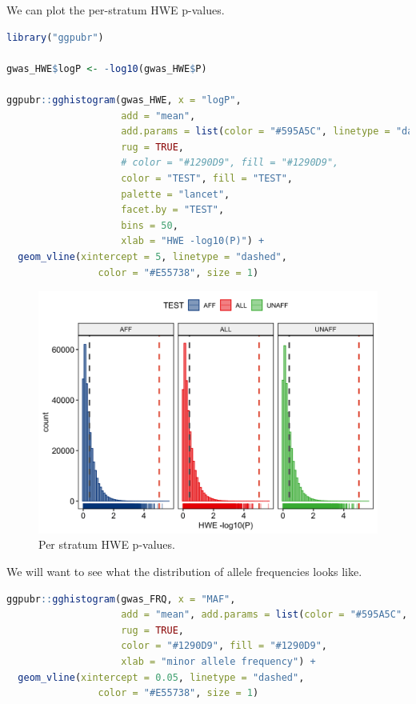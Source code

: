 \documentclass[
]{book}
\begin{document}
We can plot the per-stratum HWE p-values.

\begin{lstlisting}[language=R]
library("ggpubr")

gwas_HWE$logP <- -log10(gwas_HWE$P)

ggpubr::gghistogram(gwas_HWE, x = "logP",
                    add = "mean",
                    add.params = list(color = "#595A5C", linetype = "dashed", size = 1),
                    rug = TRUE,
                    # color = "#1290D9", fill = "#1290D9",
                    color = "TEST", fill = "TEST",
                    palette = "lancet",
                    facet.by = "TEST",
                    bins = 50,
                    xlab = "HWE -log10(P)") +
  geom_vline(xintercept = 5, linetype = "dashed",
                color = "#E55738", size = 1)
\end{lstlisting}

\begin{figure}

{\centering \includegraphics[width=18.67in]{img/show-hwe-gwas} 

}

\caption{Per stratum HWE p-values.}\label{fig:show-hwe-gwas}
\end{figure}

We will want to see what the distribution of allele frequencies looks like.

\begin{lstlisting}[language=R]
ggpubr::gghistogram(gwas_FRQ, x = "MAF",
                    add = "mean", add.params = list(color = "#595A5C", linetype = "dashed", size = 1),
                    rug = TRUE,
                    color = "#1290D9", fill = "#1290D9",
                    xlab = "minor allele frequency") +
  geom_vline(xintercept = 0.05, linetype = "dashed",
                color = "#E55738", size = 1)
\end{lstlisting}
\end{document}
